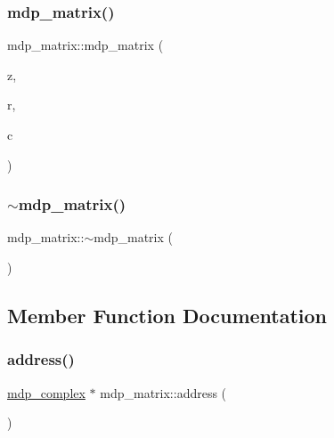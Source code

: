 \mbox{\label{classmdp__matrix_a743bde7a120b947e065c8fd7b658b163}} 
\subsubsection{\texorpdfstring{mdp\+\_\+matrix()}{mdp\_matrix()}\hspace{0.1cm}{\footnotesize\ttfamily [4/4]}}
{\footnotesize\ttfamily mdp\+\_\+matrix\+::mdp\+\_\+matrix (\begin{DoxyParamCaption}\item[{\hyperlink{classmdp__complex}{mdp\+\_\+complex} $\ast$}]{z,  }\item[{const \hyperlink{mdp__global__vars_8h_a91ad9478d81a7aaf2593e8d9c3d06a14}{uint}}]{r,  }\item[{const \hyperlink{mdp__global__vars_8h_a91ad9478d81a7aaf2593e8d9c3d06a14}{uint}}]{c }\end{DoxyParamCaption})}

\mbox{\label{classmdp__matrix_a5c20b7431f6da6f54c381331f8a09c44}} 
\subsubsection{\texorpdfstring{$\sim$mdp\+\_\+matrix()}{~mdp\_matrix()}}
{\footnotesize\ttfamily mdp\+\_\+matrix\+::$\sim$mdp\+\_\+matrix (\begin{DoxyParamCaption}{ }\end{DoxyParamCaption})\hspace{0.3cm}{\ttfamily [virtual]}}



\subsection{Member Function Documentation}
\mbox{\label{classmdp__matrix_a557c3deb958c09b99f045df8d41a506e}} 
\subsubsection{\texorpdfstring{address()}{address()}}
{\footnotesize\ttfamily \hyperlink{classmdp__complex}{mdp\+\_\+complex} $\ast$ mdp\+\_\+matrix\+::address (\begin{DoxyParamCaption}{ }\end{DoxyParamCaption})\hspace{0.3cm}{\ttfamily [inline]}}

